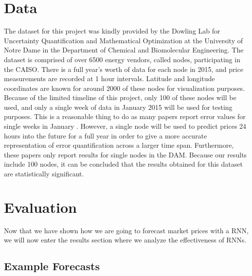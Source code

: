 \documentclass[sigconf]{acmart}
\begin{document}
\section{Data}
The dataset for this project was kindly provided by the Dowling Lab for Uncertainty Quantification and Mathematical Optimization at the University of Notre Dame in the Department of Chemical and Biomolecular Engineering. The dataset is comprised of over 6500 energy vendors, called nodes, participating in the CAISO. There is a full year's worth of data for each node in 2015, and price measurements are recorded at 1 hour intervals. Latitude and longitude coordinates are known for around 2000 of these nodes for visualization purposes. Because of the limited timeline of this project, only 100 of these nodes will be used, and only a single week of data in January 2015 will be used for testing purposes.  This is a reasonable thing to do as many papers report error values for single weeks in January \cite{Conejo2005a,Garcia2005,Tan2010}. However, a single node will be used to predict prices 24 hours into the future for a full year in order to give a more accurate representation of error quantification across a larger time span. Furthermore, these papers only report results for single nodes in the DAM. Because our results include 100 nodes, it can be concluded that the results obtained for this dataset are statistically significant. 


\section{Evaluation}
\label{sec:results}

Now that we have shown how we are going to forecast market prices with a RNN, we will now enter the results section where we analyze the effectiveness of RNNs. 

\subsection{Example Forecasts}
\end{document}
